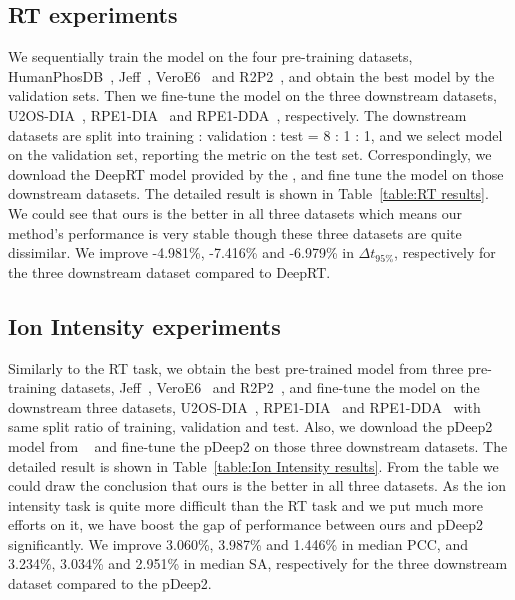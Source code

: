 \subsection{RT experiments}
We sequentially train the model on the four pre-training datasets, HumanPhosDB~\cite{lawrence2016plug}, Jeff~\cite{liu2018vivo}, VeroE6~\cite{bouhaddou2020global} and R2P2~\cite{leutert2019r2}, and obtain the best model by the validation sets. Then we fine-tune the model on the three downstream datasets,  U2OS-DIA~\cite{wang2020naguider}, RPE1-DIA~\cite{bekker2020rapid} and RPE1-DDA~\cite{bekker2020rapid}, respectively. 
The downstream datasets are split into training : validation : test = 8 : 1 : 1, and we select model on the validation set, reporting the metric on the test set.  
Correspondingly, we download the DeepRT model provided by the \cite{ma2018improved}, and fine tune the model on those downstream datasets. The detailed result is shown in Table~\ref{table:RT results}. We could see that ours is the better in all three datasets which means our method's performance is very stable though these three datasets are quite dissimilar. We improve -4.981\%, -7.416\% and -6.979\% in $\Delta$$t_{95\%}$, respectively for the three downstream dataset compared to DeepRT. 

\subsection{Ion Intensity experiments}
Similarly to the RT task, we obtain the best pre-trained model from three pre-training datasets,   Jeff~\cite{liu2018vivo}, VeroE6~\cite{bouhaddou2020global} and R2P2~\cite{leutert2019r2}, and fine-tune the model on the downstream three datasets, U2OS-DIA~\cite{wang2020naguider}, RPE1-DIA~\cite{bekker2020rapid} and RPE1-DDA~\cite{bekker2020rapid} with same split ratio of training, validation and test. Also, we download the pDeep2 model from ~\cite{zeng2019ms} and fine-tune the pDeep2 on those three downstream datasets. The detailed result is shown in Table~\ref{table:Ion Intensity results}. From the table we could draw the conclusion that ours is the better in all three datasets. As the ion intensity task is quite more difficult than the RT task and we put much more efforts on it, we have boost the gap of performance between ours and pDeep2 significantly. We improve 3.060\%, 3.987\% and 1.446\% in median PCC, and 3.234\%, 3.034\% and 2.951\% in median SA, respectively for the three downstream dataset compared to the pDeep2.

